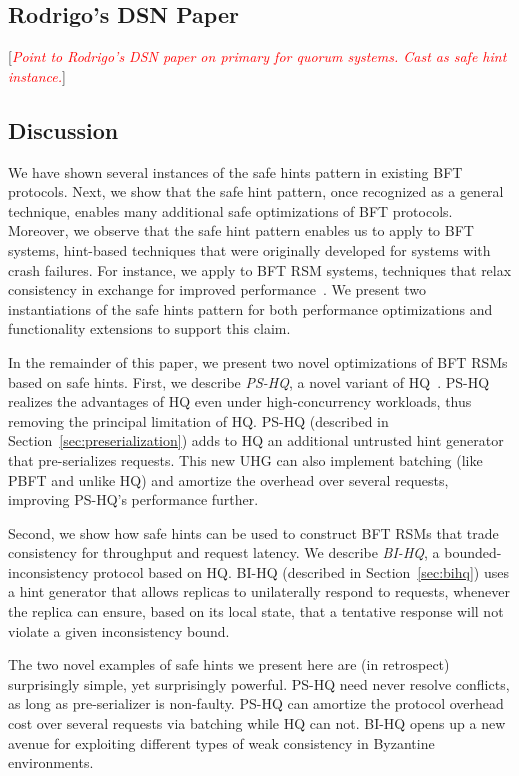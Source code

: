 \documentclass[twocolumn,10pt]{article}
\newcommand{\note}[1]{[\textcolor{red}{\textit{#1}}]}
\begin{document}
\subsection{Rodrigo's DSN Paper}

\note{Point to Rodrigo's DSN paper on primary for quorum systems. Cast
  as safe hint instance.}


\subsection{Discussion}

We have shown several instances of the safe hints pattern in existing
BFT protocols. Next, we show that the safe
hint pattern, once recognized as a general technique, enables many
additional safe optimizations of BFT protocols.  Moreover, we observe
that the safe hint pattern enables us to apply to BFT systems,
hint-based techniques that were originally developed for systems with
crash failures.  For instance, we apply to BFT RSM systems, techniques 
that relax consistency in
exchange for improved
performance~\cite{Satyanarayanan2002,Terry1995,Yu2002}.  We present
two instantiations of the safe hints pattern for both performance
optimizations and functionality extensions to support this claim.



In the remainder of this paper, we present two novel optimizations of BFT
RSMs based on safe hints. First, we describe \emph{PS-HQ}, a novel
variant of HQ~\cite{hq-replication-osdi-06}. PS-HQ realizes the
advantages of HQ even under high-concurrency workloads, thus removing
the principal limitation of HQ.  PS-HQ (described in
Section~\ref{sec:preserialization}) adds to HQ an additional untrusted hint
generator that pre-serializes requests. This new UHG
can also implement batching (like PBFT and unlike HQ) and amortize the
overhead over several requests, improving PS-HQ's performance further.

Second, we show how safe hints can be used to construct BFT RSMs that
trade consistency for throughput and request latency. We describe
\emph{BI-HQ}, a bounded-inconsistency protocol based on HQ. BI-HQ
(described in Section~\ref{sec:bihq}) uses a hint generator that
allows replicas to unilaterally respond to requests, whenever the
replica can ensure, based on its local state, that a tentative response will
not violate a given inconsistency bound.  

The two novel examples of safe hints we present here are (in
retrospect) surprisingly simple, yet surprisingly powerful. PS-HQ need
never resolve conflicts, as long as pre-serializer is non-faulty. PS-HQ can
amortize the protocol overhead cost over several requests via batching while
HQ can not.
BI-HQ opens up a new avenue for exploiting different types of weak consistency
in Byzantine environments.
\fi
\end{document}
